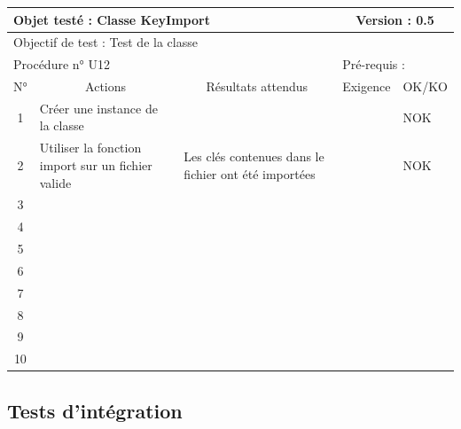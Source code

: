 \documentclass{../res/univ-projet}
\begin{document}
\begin{center}
    \begin{tabular}{|c|p{5cm}|p{5cm}|p{1.5cm}|p{1.5cm}|}
      \hline
      \multicolumn{3}{|l|}{Objet testé : Classe KeyImport} & \multicolumn{2}{c|}{Version : 0.5}\\ \hline
      \multicolumn{5}{|l|}{Objectif de test : Test de la classe}\\ \hline
      \multicolumn{3}{|l|}{Procédure n° U12} & \multicolumn{2}{p{3cm}|}{Pré-requis : }\\ \hline
      \multicolumn{1}{|c|}{N°} & \multicolumn{1}{c|}{Actions} & \multicolumn{1}{c|}{Résultats attendus} & 
      \multicolumn{1}{c|}{Exigence} & \multicolumn{1}{c|}{OK/KO}\\ \hline
      1 & Créer une instance de la classe &  &  & NOK \\
      2 & Utiliser la fonction import sur un fichier valide & Les clés contenues dans le fichier ont été importées &  & NOK \\
      3 &  &  &  &  \\
      4 &  &  &  &  \\
      5 &  &  &  &  \\
      6 &  &  &  &  \\
      7 &  &  &  &  \\
      8 &  &  &  &  \\
      9 &  &  &  & \\
      10 &  &  &  & \\ 
  \hline
    \end{tabular}
    \vskip 2.2cm    


\subsection{Tests d'intégration}



\end{center}
\end{document}
